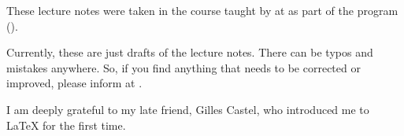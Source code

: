 \begin{myminipage} 
     These lecture notes were taken in the course \textit{\courseloc} taught by \profloc{} at \instituteloc{} as part of the \classloc{} program (\sessionloc). \bigskip
     
     Currently, these are just drafts of the lecture notes. There can be typos and mistakes anywhere. So, if you find anything that needs to be corrected or improved, please inform at \myemailloc. \bigskip

     I am deeply grateful to my late friend, Gilles Castel, who introduced me to \LaTeX{} for the first time.
\end{myminipage}
